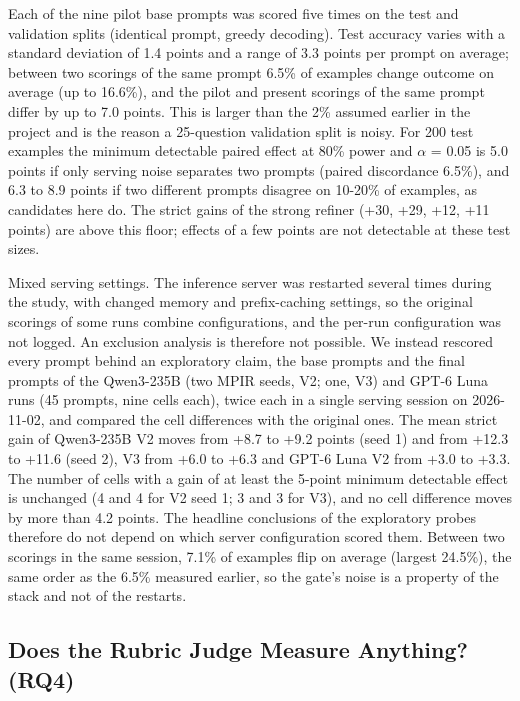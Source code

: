 \documentclass{ieeeaccess}
\begin{document}
Each of the nine pilot base prompts was scored five times on the test and validation splits (identical prompt, greedy decoding). Test accuracy varies with a standard deviation of 1.4 points and a range of 3.3 points per prompt on average; between two scorings of the same prompt 6.5\% of examples change outcome on average (up to 16.6\%), and the pilot and present scorings of the same prompt differ by up to 7.0 points. This is larger than the 2\% assumed earlier in the project and is the reason a 25-question validation split is noisy. For 200 test examples the minimum detectable paired effect at 80\% power and $\alpha$ = 0.05 is 5.0 points if only serving noise separates two prompts (paired discordance 6.5\%), and 6.3 to 8.9 points if two different prompts disagree on 10-20\% of examples, as candidates here do. The strict gains of the strong refiner (+30, +29, +12, +11 points) are above this floor; effects of a few points are not detectable at these test sizes.

Mixed serving settings. The inference server was restarted several times during the study, with changed memory and prefix-caching settings, so the original scorings of some runs combine configurations, and the per-run configuration was not logged. An exclusion analysis is therefore not possible. We instead rescored every prompt behind an exploratory claim, the base prompts and the final prompts of the Qwen3-235B (two MPIR seeds, V2; one, V3) and GPT-6 Luna runs (45 prompts, nine cells each), twice each in a single serving session on 2026-11-02, and compared the cell differences with the original ones. The mean strict gain of Qwen3-235B V2 moves from +8.7 to +9.2 points (seed 1) and from +12.3 to +11.6 (seed 2), V3 from +6.0 to +6.3 and GPT-6 Luna V2 from +3.0 to +3.3. The number of cells with a gain of at least the 5-point minimum detectable effect is unchanged (4 and 4 for V2 seed 1; 3 and 3 for V3), and no cell difference moves by more than 4.2 points. The headline conclusions of the exploratory probes therefore do not depend on which server configuration scored them. Between two scorings in the same session, 7.1\% of examples flip on average (largest 24.5\%), the same order as the 6.5\% measured earlier, so the gate's noise is a property of the stack and not of the restarts.

\subsection{Does the Rubric Judge Measure Anything? (RQ4)}
\end{document}

